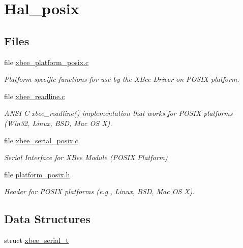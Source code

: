 \hypertarget{group__hal__posix}{}\section{Hal\+\_\+posix}
\label{group__hal__posix}
\subsection*{Files}
\begin{DoxyCompactItemize}
\item 
file \hyperlink{xbee__platform__posix_8c}{xbee\+\_\+platform\+\_\+posix.\+c}
\begin{DoxyCompactList}\small\item\em Platform-\/specific functions for use by the X\+Bee Driver on P\+O\+S\+IX platform. \end{DoxyCompactList}\item 
file \hyperlink{xbee__readline_8c}{xbee\+\_\+readline.\+c}
\begin{DoxyCompactList}\small\item\em A\+N\+SI C xbee\+\_\+readline() implementation that works for P\+O\+S\+IX platforms (Win32, Linux, B\+SD, Mac OS X). \end{DoxyCompactList}\item 
file \hyperlink{xbee__serial__posix_8c}{xbee\+\_\+serial\+\_\+posix.\+c}
\begin{DoxyCompactList}\small\item\em Serial Interface for X\+Bee Module (P\+O\+S\+IX Platform) \end{DoxyCompactList}\item 
file \hyperlink{platform__posix_8h}{platform\+\_\+posix.\+h}
\begin{DoxyCompactList}\small\item\em Header for P\+O\+S\+IX platforms (e.\+g., Linux, B\+SD, Mac OS X). \end{DoxyCompactList}\end{DoxyCompactItemize}
\subsection*{Data Structures}
\begin{DoxyCompactItemize}
\item 
struct \hyperlink{structxbee__serial__t}{xbee\+\_\+serial\+\_\+t}
\end{DoxyCompactItemize}
